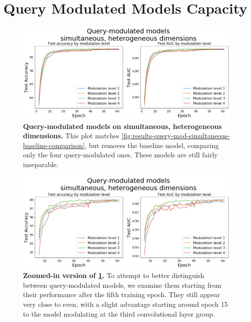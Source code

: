 \section{Query Modulated Models Capacity \label{sec:additional-figures-query-mod-simultaneous}}

\begin{figure}[!htb]
\centering
\includegraphics[width=\linewidth]{ch-results/figures/query_mod_simultaneous/query_mod_only.png}
\caption[Query-modulated models on simultaneous, heterogeneous dimensions.]{ {\bf Query-modulated models on simultaneous, heterogeneous dimensions.} This plot matches \ref{fig:results-query-mod-simultaneous-baseline-comparison}, but removes the baseline model, comparing only the four query-modulated ones. These models are still fairly inseparable.}
\label{fig:results-query-mod-simultaneous-query-mod-only}
\end{figure}

\begin{figure}[!htb]
\centering
\includegraphics[width=\linewidth]{ch-results/figures/query_mod_simultaneous/query_mod_zoomed.png}
\caption[Zoomed-in version of \ref{fig:results-query-mod-simultaneous-query-mod-only}.]{ {\bf Zoomed-in version of \ref{fig:results-query-mod-simultaneous-query-mod-only}.} To attempt to better distinguish between query-modulated models, we examine them starting from their performance after the fifth training epoch. They still appear very close to even, with a slight advantage starting around epoch 15 to the model modulating at the third convolutional layer group.}
\label{fig:results-query-mod-simultaneous-query-mod-zoomed}
\end{figure}
